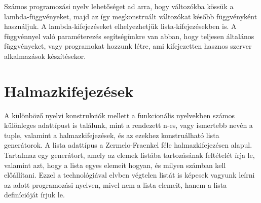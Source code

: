 \documentclass[margin=0px]{article}
\begin{document}
Számos programozási nyelv lehetőséget ad arra, hogy változókba kössük a lambda-függvényeket, majd az így megkonstruált változókat később függvényként használjuk. A lambda-kifejezéseket elhelyezhetjük lista-kifejezésekben is. A függvénnyel való paraméterezés segítségünkre van abban, hogy teljesen általános függvényeket, vagy programokat hozzunk létre, ami kifejezetten hasznos szerver alkalmazások készítésekor.

\section{Halmazkifejezések}
A különböző nyelvi konstrukciók mellett a funkcionális nyelvekben számos különleges adattípust is találunk, mint a rendezett n-es, vagy ismertebb nevén a tuple, valamint a halmazkifejezések, és az ezekhez konstruálható lista generátorok. A lista adattípus a Zermelo-Fraenkel féle halmazkifejezésen alapul. Tartalmaz egy generátort, amely az elemek listába tartozásának feltételét írja le, valamint azt, hogy a lista egyes elemeit hogyan, és milyen számban kell előállítani. Ezzel a technológiával elvben végtelen listát is képesek vagyunk leírni az adott programozási nyelven, mivel nem a lista elemeit, hanem a lista definícióját írjuk le.
\end{document}
